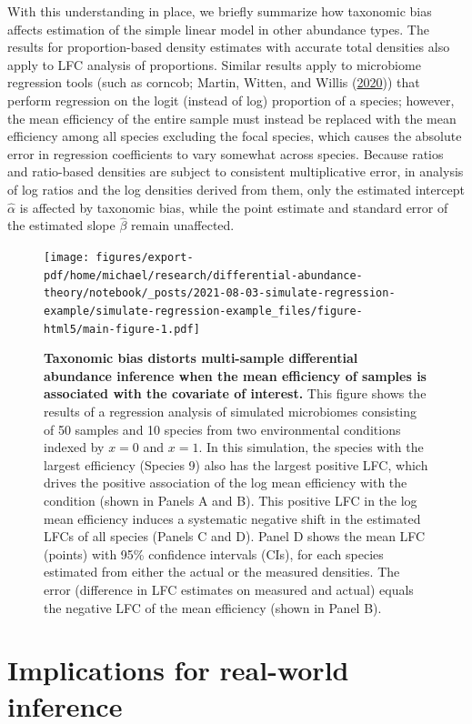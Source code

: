 \documentclass[
]{article}
\begin{document}
With this understanding in place, we briefly summarize how taxonomic bias affects estimation of the simple linear model in other abundance types.
The results for proportion-based density estimates with accurate total densities also apply to LFC analysis of proportions.
Similar results apply to microbiome regression tools (such as corncob; Martin, Witten, and Willis (\protect\hyperlink{ref-martin2020mode}{2020})) that perform regression on the logit (instead of log) proportion of a species; however,
the mean efficiency of the entire sample must instead be replaced with the mean efficiency among all species excluding the focal species, which causes the absolute error in regression coefficients to vary somewhat across species.
Because ratios and ratio-based densities are subject to consistent multiplicative error, in analysis of log ratios and the log densities derived from them, only the estimated intercept \(\hat \alpha\) is affected by taxonomic bias, while the point estimate and standard error of the estimated slope \(\hat \beta\) remain unaffected.

\begin{figure}
\centering
\texttt{[image: figures/export-pdf/home/michael/research/differential-abundance-theory/notebook/\_posts/2021-08-03-simulate-regression-example/simulate-regression-example\_files/figure-html5/main-figure-1.pdf]}
\caption{\label{fig:regression-example}\textbf{Taxonomic bias distorts multi-sample differential abundance inference when the mean efficiency of samples is associated with the covariate of interest.} This figure shows the results of a regression analysis of simulated microbiomes consisting of 50 samples and 10 species from two environmental conditions indexed by \(x=0\) and \(x=1\). In this simulation, the species with the largest efficiency (Species 9) also has the largest positive LFC, which drives the positive association of the log mean efficiency with the condition (shown in Panels A and B). This positive LFC in the log mean efficiency induces a systematic negative shift in the estimated LFCs of all species (Panels C and D). Panel D shows the mean LFC (points) with 95\% confidence intervals (CIs), for each species estimated from either the actual or the measured densities. The error (difference in LFC estimates on measured and actual) equals the negative LFC of the mean efficiency (shown in Panel B).}
\end{figure}



\hypertarget{implications}{%
\section{Implications for real-world inference~}\label{implications}}
\end{document}
